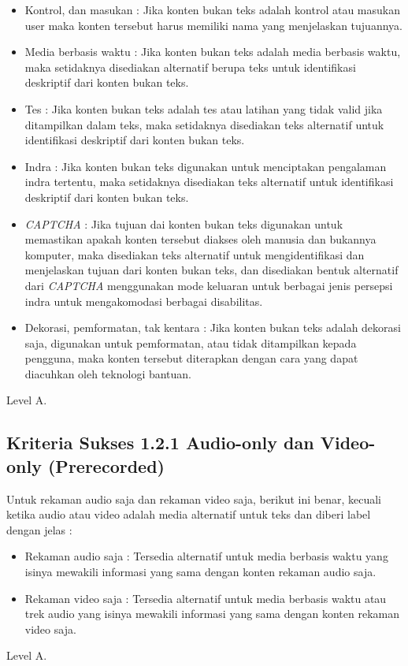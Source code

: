 \begin{itemize}
	\item Kontrol, dan masukan : Jika konten bukan teks adalah kontrol atau masukan user maka konten tersebut harus memiliki nama yang menjelaskan tujuannya.
	\item Media berbasis waktu : Jika konten bukan teks adalah media berbasis waktu, maka setidaknya disediakan alternatif berupa teks untuk identifikasi deskriptif dari konten bukan teks.
	\item Tes : Jika konten bukan teks adalah tes atau latihan yang tidak valid jika ditampilkan dalam teks, maka setidaknya disediakan teks alternatif untuk identifikasi deskriptif dari konten bukan teks.
	\item Indra : Jika konten bukan teks digunakan untuk menciptakan pengalaman indra tertentu, maka setidaknya disediakan teks alternatif untuk identifikasi deskriptif dari konten bukan teks.
	\item \textit{CAPTCHA} : Jika tujuan dai konten bukan teks digunakan untuk memastikan apakah konten tersebut diakses oleh manusia dan bukannya komputer, maka disediakan teks alternatif untuk mengidentifikasi dan menjelaskan tujuan dari konten bukan teks, dan disediakan bentuk alternatif dari \textit{CAPTCHA} menggunakan mode keluaran untuk berbagai jenis persepsi indra untuk mengakomodasi berbagai disabilitas.
	\item Dekorasi, pemformatan, tak kentara : Jika konten bukan teks adalah dekorasi saja, digunakan untuk pemformatan, atau tidak ditampilkan kepada pengguna, maka konten tersebut diterapkan dengan cara yang dapat diacuhkan oleh teknologi bantuan.
\end{itemize} 

Level A.

\subsection{Kriteria Sukses 1.2.1 Audio-only dan Video-only (Prerecorded)}
\label{sec:kriteria_1.2.1}
Untuk rekaman audio saja dan rekaman video saja, berikut ini benar, kecuali ketika audio atau video adalah media alternatif untuk teks dan diberi label dengan jelas : 
\begin{itemize}
	\item Rekaman audio saja : Tersedia alternatif untuk media berbasis waktu yang isinya mewakili informasi yang sama dengan konten rekaman audio saja.
	\item Rekaman video saja : Tersedia alternatif untuk media berbasis waktu atau trek audio yang isinya mewakili informasi yang sama dengan konten rekaman video saja.
\end{itemize}
Level A.

